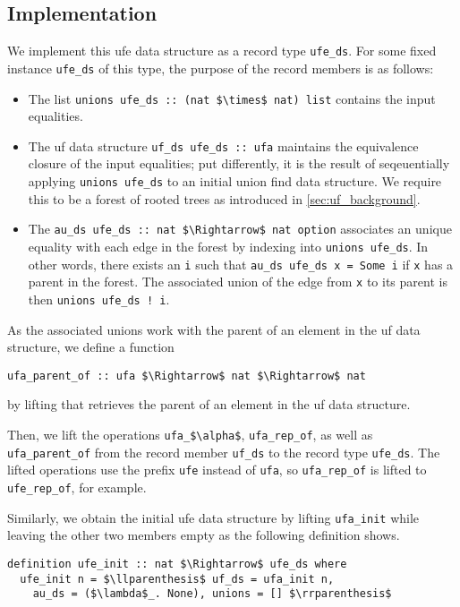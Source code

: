 \documentclass[
  sigplan,
  10pt,
  anonymous,
  review,
  ]{acmart}
\begin{document}
\subsection{Implementation}
We implement this \acrshort{ufe} data structure as a record type \lstinline|ufe_ds|.
For some fixed instance \lstinline|ufe_ds| of this type, the purpose of the record members is as follows:
\begin{itemize}
  \item The list \lstinline|unions ufe_ds :: (nat $\times$ nat) list| contains the input equalities.
  \item The \acrshort{uf} data structure \lstinline|uf_ds ufe_ds :: ufa| maintains the equivalence closure of the input equalities;
  put differently, it is the result of seqeuentially applying \lstinline|unions ufe_ds| to an initial union find data structure.
    We require this to be a forest of rooted trees as introduced in \autoref{sec:uf_background}.
  \item The \lstinline|au_ds ufe_ds :: nat $\Rightarrow$ nat option| associates an unique equality with each edge in the forest by indexing into \lstinline|unions ufe_ds|.
    In other words, there exists an \lstinline|i| such that \lstinline|au_ds ufe_ds x = Some i| if \lstinline|x| has a parent in the forest.
    The associated union of the edge from \lstinline|x| to its parent is then \lstinline|unions ufe_ds ! i|.
\end{itemize}
As the associated unions work with the parent of an element in the \acrshort{uf} data structure, we define a function
\begin{lstlisting}
ufa_parent_of :: ufa $\Rightarrow$ nat $\Rightarrow$ nat
\end{lstlisting}
by lifting that retrieves the parent of an element in the \acrshort{uf} data structure.

Then, we lift the operations \lstinline|ufa_$\alpha$|, \lstinline|ufa_rep_of|, as well as \lstinline|ufa_parent_of| from the record member \lstinline|uf_ds| to the record type \lstinline|ufe_ds|.
The lifted operations use the prefix \lstinline|ufe| instead of \lstinline|ufa|, so \lstinline|ufa_rep_of| is lifted to \lstinline|ufe_rep_of|, for example.

Similarly, we obtain the initial \acrshort{ufe} data structure by lifting \lstinline|ufa_init| while leaving the other two members empty as the following definition shows.
\begin{lstlisting}
definition ufe_init :: nat $\Rightarrow$ ufe_ds where
  ufe_init n = $\llparenthesis$ uf_ds = ufa_init n,
    au_ds = ($\lambda$_. None), unions = [] $\rrparenthesis$
\end{lstlisting}
\end{document}
